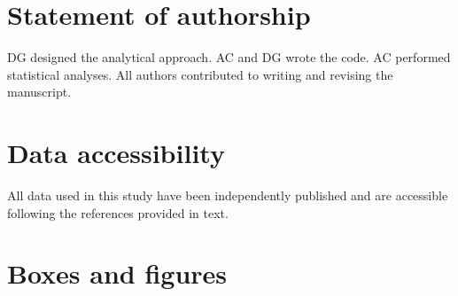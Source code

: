 \documentclass[12pt]{article}
\begin{document}
\begin{spacing}{2.0}
\section*{Statement of authorship}

DG designed the analytical approach. AC and DG wrote the code. AC performed statistical analyses. All authors contributed to writing and revising the manuscript.


\section*{Data accessibility}

All data used in this study have been independently published and are accessible following the references provided in text.



\end{spacing}
\clearpage


\section*{Boxes and figures}
\end{document}
